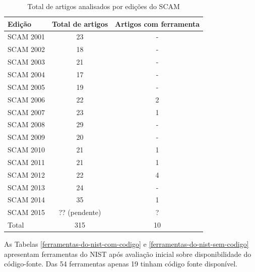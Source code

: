 \documentclass[12pt]{article}
\begin{document}
\begin{table}
\caption{Total de artigos analisados por edições do SCAM}
\centering
\begin{tabular}{| l | c | c |}
\hline
Edição    & Total de artigos & Artigos com ferramenta \\
\hline
SCAM 2001 & 23               & -                      \\
SCAM 2002 & 18               & -                      \\
SCAM 2003 & 21               & -                      \\
SCAM 2004 & 17               & -                      \\
SCAM 2005 & 19               & -                      \\
SCAM 2006 & 22               & 2                      \\
SCAM 2007 & 23               & 1                      \\
SCAM 2008 & 29               & -                      \\
SCAM 2009 & 20               & -                      \\
SCAM 2010 & 21               & 1                      \\
SCAM 2011 & 21               & 1                      \\
SCAM 2012 & 22               & 4                      \\
SCAM 2013 & 24               & -                      \\
SCAM 2014 & 35               & 1                      \\
SCAM 2015 & ?? (pendente)    & ?                      \\
\hline
Total     & 315              & 10                     \\
\hline
\end{tabular}
\label{artigos-do-scam}
\end{table}

As Tabelas \ref{ferramentas-do-nist-com-codigo} e
\ref{ferramentas-do-nist-sem-codigo} apresentam ferramentas do NIST após
avaliação inicial sobre disponibilidade do código-fonte. Das 54 ferramentas
apenas 19 tinham código fonte disponível.

\end{document}
